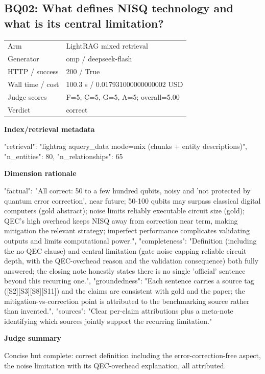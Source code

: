 \documentclass[10pt]{article}
\begin{document}
\subsection{BQ02: What defines NISQ technology and what is its central limitation?}
\begin{tabular}{@{}ll@{}}
Arm & LightRAG mixed retrieval\\
Generator & omp / deepseek-flash\\
HTTP / success & 200 / True\\
Wall time / cost & 100.3 s / 0.017931000000000002 USD\\
Judge scores & F=5, C=5, G=5, A=5; overall=5.00\\
Verdict & correct\\
\end{tabular}

\textbf{Index/retrieval metadata}
\begin{EvidenceText}
{
  "retrieval": "lightrag aquery_data mode=mix (chunks + entity descriptions)",
  "n_entities": 80,
  "n_relationships": 65
}
\end{EvidenceText}

\textbf{Dimension rationale}
\begin{EvidenceText}
{
  "factual": "All correct: 50 to a few hundred qubits, noisy and 'not protected by quantum error correction', near future; 50-100 qubits may surpass classical digital computers (gold abstract); noise limits reliably executable circuit size (gold); QEC's high overhead keeps NISQ away from correction near term, making mitigation the relevant strategy; imperfect performance complicates validating outputs and limits computational power.",
  "completeness": "Definition (including the no-QEC clause) and central limitation (gate noise capping reliable circuit depth, with the QEC-overhead reason and the validation consequence) both fully answered; the closing note honestly states there is no single 'official' sentence beyond this recurring one.",
  "groundedness": "Each sentence carries a source tag ([S2][S3][S8][S11]) and the claims are consistent with gold and the paper; the mitigation-vs-correction point is attributed to the benchmarking source rather than invented.",
  "sources": "Clear per-claim attributions plus a meta-note identifying which sources jointly support the recurring limitation."
}
\end{EvidenceText}

\textbf{Judge summary}
\begin{EvidenceText}
Concise but complete: correct definition including the error-correction-free aspect, the noise limitation with its QEC-overhead explanation, all attributed.
\end{EvidenceText}
\end{document}
